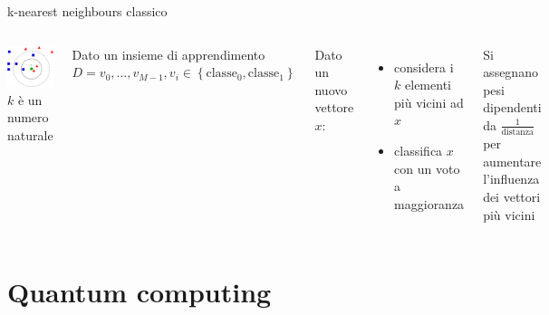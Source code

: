 \documentclass{beamer}
\begin{document}
    \begin{frame}{k-nearest neighbours classico}
        \begin{columns}
            \includegraphics[width=\textwidth]{gfx/KnnClassification.png}
            $k$ è un numero naturale

            Dato un insieme di apprendimento $D = v_0,\ldots,v_{M-1}, v_i\in\left\{ \text{classe}_0, \text{classe}_1 \right\}$

            Dato un nuovo vettore $x$: 
            \begin{itemize}
                \item considera i $k$ elementi più vicini ad $x$
                \item classifica $x$ con un voto a maggioranza
            \end{itemize}

            Si assegnano pesi dipendenti da $\frac{1}{\text{distanza}}$ per aumentare l'influenza 
            dei vettori più vicini

        \end{columns}
    \end{frame}

    \section{Quantum computing}
\end{document}
